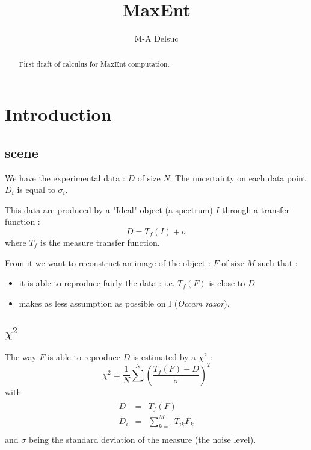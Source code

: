\documentclass[]{article}
\title{MaxEnt}
\author{M-A Delsuc  }
\begin{document}
\maketitle


\begin{abstract}
First draft of calculus for MaxEnt computation.
\end{abstract}

\section{Introduction}
\subsection{scene} %
We have the experimental data : $D$ of size $N$.
The uncertainty on each data point $D_i$ is equal to $\sigma_i$.

This data are produced by a "Ideal" object (a spectrum) $I$ through a transfer function :
\begin{equation}
	D = T_f(I) + \sigma
\end{equation}
where $T_f$ is the measure transfer function.

From it we want to reconstruct an image of the object : $F$ of size $M$ such that :
\begin{itemize}
	\item it is able to reproduce fairly the data : i.e. $T_f(F)$ is close to $D$
	\item makes as less assumption as possible on I (\emph{Occam razor}).
\end{itemize}

\subsection{$\chi^2$} %
The way $F$ is able to reproduce $D$ is estimated by a $\chi^2$ :
\begin{equation}
	\chi^2 = \frac 1 N \sum^N \left (\frac{T_f(F)-D}{\sigma}\right )^2
\end{equation}
with
\begin{eqnarray}
	\tilde{D} &=& T_f(F)	\\
	\tilde{D_i} &=& \sum_{k=1}^M T_{ik}F_k	\\
\end{eqnarray}
and $\sigma$ being the standard deviation of the measure (the noise level).
\end{document}
